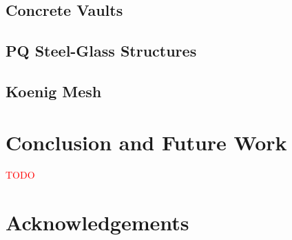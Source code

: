 \documentclass[annual]{acmsiggraph}
\newcommand{\todo}[1]{\textcolor{red}{#1}}
\begin{document}
\subsection{Concrete Vaults}

\subsection{PQ Steel-Glass Structures}

\subsection{Koenig Mesh} \label{sec:koenig}

\section{Conclusion and Future Work}

\todo{TODO}

\section*{Acknowledgements}



\end{document}
